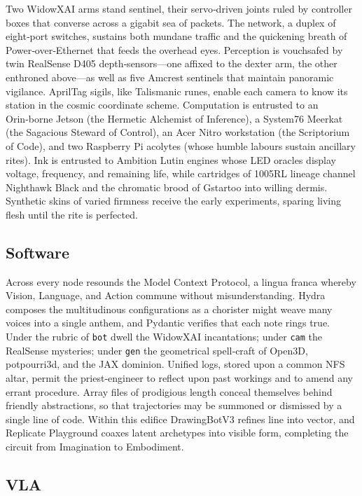 \documentclass[11pt]{article}
\begin{document}
Two WidowXAI arms stand sentinel, their servo‑driven joints ruled by controller boxes that converse across a gigabit sea of packets.  
The network, a duplex of eight‑port switches, sustains both mundane traffic and the quickening breath of Power‑over‑Ethernet that feeds the overhead eyes.  
Perception is vouchsafed by twin RealSense D405 depth‑sensors—one affixed to the dexter arm, the other enthroned above—as well as five Amcrest sentinels that maintain panoramic vigilance.  
AprilTag sigils, like Talismanic runes, enable each camera to know its station in the cosmic coordinate scheme.  
Computation is entrusted to an Orin‑borne Jetson (the Hermetic Alchemist of Inference), a System76 Meerkat (the Sagacious Steward of Control), an Acer Nitro workstation (the Scriptorium of Code), and two Raspberry Pi acolytes (whose humble labours sustain ancillary rites).  
Ink is entrusted to Ambition Lutin engines whose LED oracles display voltage, frequency, and remaining life, while cartridges of 1005RL lineage channel Nighthawk Black and the chromatic brood of Gstartoo into willing dermis.  
Synthetic skins of varied firmness receive the early experiments, sparing living flesh until the rite is perfected.

\subsection{Software}

\cite{Kim2025pyroki}

Across every node resounds the Model Context Protocol, a lingua franca whereby Vision, Language, and Action commune without misunderstanding.  
Hydra composes the multitudinous configurations as a chorister might weave many voices into a single anthem, and Pydantic verifies that each note rings true.  
Under the rubric of \texttt{bot} dwell the WidowXAI incantations; under \texttt{cam} the RealSense mysteries; under \texttt{gen} the geometrical spell‑craft of Open3D, potpourri3d, and the JAX dominion.  
Unified logs, stored upon a common NFS altar, permit the priest‑engineer to reflect upon past workings and to amend any errant procedure.  
Array files of prodigious length conceal themselves behind friendly abstractions, so that trajectories may be summoned or dismissed by a single line of code.  
Within this edifice DrawingBotV3 refines line into vector, and Replicate Playground coaxes latent archetypes into visible form, completing the circuit from Imagination to Embodiment.

\subsection{VLA}
\end{document}

